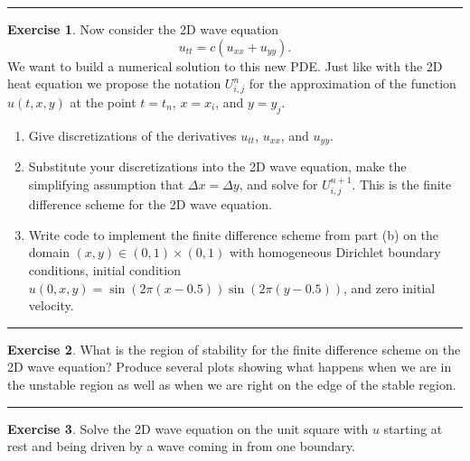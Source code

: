 \documentclass[
]{book}
\providecommand{\tightlist}{%
  \setlength{\itemsep}{0pt}\setlength{\parskip}{0pt}}
\theoremstyle{definition}
\theoremstyle{definition}
\theoremstyle{definition}
\newtheorem{exercise}{Exercise}[chapter]
\theoremstyle{remark}
\begin{document}
\begin{center}\rule{0.5\linewidth}{0.5pt}\end{center}

\begin{exercise}
\protect\hypertarget{exr:unnamed-chunk-581}{}{\label{exr:unnamed-chunk-581} }Now consider the 2D wave equation
\[ u_{tt} = c\left( u_{xx} + u_{yy} \right). \]
We want to build a numerical solution to this new PDE. Just like with the 2D heat equation we propose the notation \(U_{i,j}^n\) for the approximation of the function \(u(t,x,y)\) at the point \(t=t_n\), \(x=x_i\), and \(y=y_j\).

\begin{enumerate}
\def\labelenumi{\alph{enumi}.}
\tightlist
\item
  Give discretizations of the derivatives \(u_{tt}\), \(u_{xx}\), and \(u_{yy}\).\\
\item
  Substitute your discretizations into the 2D wave equation, make the simplifying assumption that \(\Delta x = \Delta y\), and solve for \(U_{i,j}^{n+1}\). This is the finite difference scheme for the 2D wave equation.
\item
  Write code to implement the finite difference scheme from part (b) on the domain \((x,y) \in (0,1)\times (0,1)\) with homogeneous Dirichlet boundary conditions, initial condition \(u(0,x,y) = \sin(2\pi (x-0.5))\sin(2\pi(y-0.5))\), and zero initial velocity.
\end{enumerate}
\end{exercise}

\begin{center}\rule{0.5\linewidth}{0.5pt}\end{center}

\begin{exercise}
\protect\hypertarget{exr:unnamed-chunk-582}{}{\label{exr:unnamed-chunk-582} }What is the region of stability for the finite difference scheme on the 2D wave equation? Produce several plots showing what happens when we are in the unstable region as well as when we are right on the edge of the stable region.
\end{exercise}

\begin{center}\rule{0.5\linewidth}{0.5pt}\end{center}

\begin{exercise}
\protect\hypertarget{exr:unnamed-chunk-583}{}{\label{exr:unnamed-chunk-583} }Solve the 2D wave equation on the unit square with \(u\) starting at rest and being driven by a wave coming in from one boundary.
\end{exercise}
\end{document}
